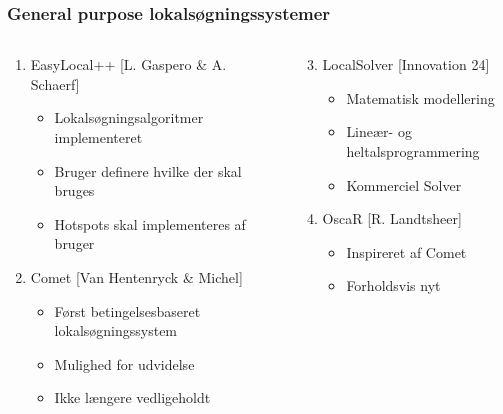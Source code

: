 \documentclass[smaller,handouts]{beamer}
\begin{document}
\begin{frame}
 \frametitle{General purpose lokalsøgningssystemer}
 \begin{columns}[T]
    \begin{column}[T]{.5\textwidth}
     \begin{enumerate}[<+->]
  \item EasyLocal++ {\scriptsize [L. Gaspero \& A. Schaerf]}
  \begin{itemize}[<+->]
   \item Lokalsøgningsalgoritmer implementeret
   \item Bruger definere hvilke der skal bruges 
   \item Hotspots skal implementeres af bruger
  \end{itemize}
     \item Comet {\scriptsize [Van Hentenryck \& Michel]}
  \begin{itemize}[<+->]
   \item Først betingelsesbaseret lokalsøgningssystem
   \item Mulighed for udvidelse
   \item Ikke længere vedligeholdt
  \end{itemize}
\end{enumerate}
\end{column} 
\begin{column}[T]{.5\textwidth}
     \begin{enumerate}[<+->]
     \setcounter{enumi}{2}
       \item LocalSolver {\scriptsize [Innovation 24]}
  \begin{itemize}[<+->]
   \item Matematisk modellering
   \item Lineær- og heltalsprogrammering
   \item Kommerciel Solver	
  \end{itemize}
\item OscaR  {\scriptsize [R. Landtsheer]}
  \begin{itemize}[<+->]
   \item Inspireret af Comet
   \item Forholdsvis nyt
  \end{itemize}
   \end{enumerate}  
\end{column}
\end{columns}
\end{frame}
\end{document}
